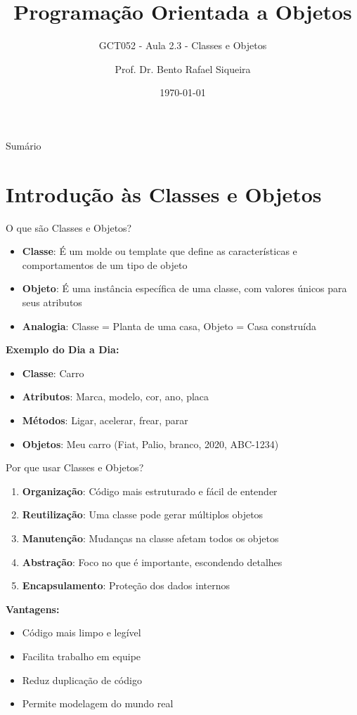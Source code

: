 \documentclass[aspectratio=169]{beamer}
\title{Programação Orientada a Objetos}
\subtitle{GCT052 - Aula 2.3 - Classes e Objetos}
\author{Prof. Dr. Bento Rafael Siqueira}
\institute{Universidade Federal de Lavras\\Departamento de Ciência da Computação}
\date{\today}
\begin{document}
\begin{frame}
\titlepage
\end{frame}

\begin{frame}{Sumário}
\tableofcontents
\end{frame}

\section{Introdução às Classes e Objetos}

\begin{frame}{O que são Classes e Objetos?}
\begin{itemize}
\item \textbf{Classe}: É um molde ou template que define as características e comportamentos de um tipo de objeto
\item \textbf{Objeto}: É uma instância específica de uma classe, com valores únicos para seus atributos
\item \textbf{Analogia}: Classe = Planta de uma casa, Objeto = Casa construída
\end{itemize}

\vspace{0.5cm}
\textbf{Exemplo do Dia a Dia:}
\begin{itemize}
\item \textbf{Classe}: Carro
\item \textbf{Atributos}: Marca, modelo, cor, ano, placa
\item \textbf{Métodos}: Ligar, acelerar, frear, parar
\item \textbf{Objetos}: Meu carro (Fiat, Palio, branco, 2020, ABC-1234)
\end{itemize}
\end{frame}

\begin{frame}{Por que usar Classes e Objetos?}
\begin{enumerate}
\item \textbf{Organização}: Código mais estruturado e fácil de entender
\item \textbf{Reutilização}: Uma classe pode gerar múltiplos objetos
\item \textbf{Manutenção}: Mudanças na classe afetam todos os objetos
\item \textbf{Abstração}: Foco no que é importante, escondendo detalhes
\item \textbf{Encapsulamento}: Proteção dos dados internos
\end{enumerate}

\vspace{0.5cm}
\textbf{Vantagens:}
\begin{itemize}
\item Código mais limpo e legível
\item Facilita trabalho em equipe
\item Reduz duplicação de código
\item Permite modelagem do mundo real
\end{itemize}
\end{frame}
\end{document}
